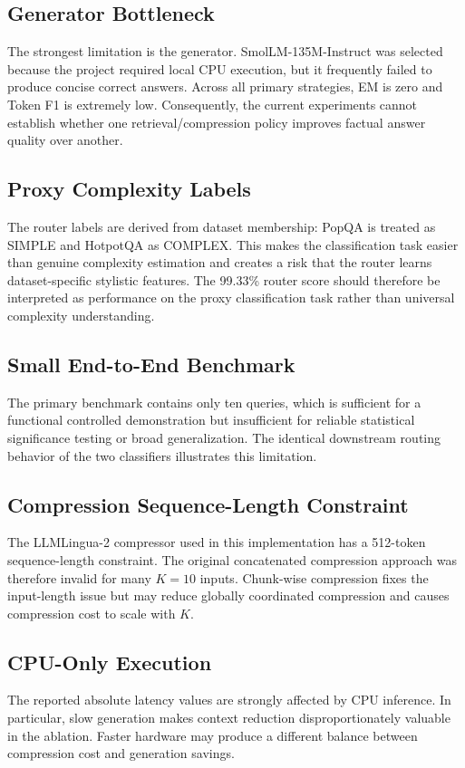 \documentclass[conference]{IEEEtran}
\begin{document}
\subsection{Generator Bottleneck}
The strongest limitation is the generator. SmolLM-135M-Instruct was selected because the project required local CPU execution, but it frequently failed to produce concise correct answers. Across all primary strategies, EM is zero and Token F1 is extremely low. Consequently, the current experiments cannot establish whether one retrieval/compression policy improves factual answer quality over another.

\subsection{Proxy Complexity Labels}
The router labels are derived from dataset membership: PopQA is treated as SIMPLE and HotpotQA as COMPLEX. This makes the classification task easier than genuine complexity estimation and creates a risk that the router learns dataset-specific stylistic features. The 99.33\% router score should therefore be interpreted as performance on the proxy classification task rather than universal complexity understanding.

\subsection{Small End-to-End Benchmark}
The primary benchmark contains only ten queries, which is sufficient for a functional controlled demonstration but insufficient for reliable statistical significance testing or broad generalization. The identical downstream routing behavior of the two classifiers illustrates this limitation.

\subsection{Compression Sequence-Length Constraint}
The LLMLingua-2 compressor used in this implementation has a 512-token sequence-length constraint. The original concatenated compression approach was therefore invalid for many $K=10$ inputs. Chunk-wise compression fixes the input-length issue but may reduce globally coordinated compression and causes compression cost to scale with $K$.

\subsection{CPU-Only Execution}
The reported absolute latency values are strongly affected by CPU inference. In particular, slow generation makes context reduction disproportionately valuable in the ablation. Faster hardware may produce a different balance between compression cost and generation savings.
\end{document}

